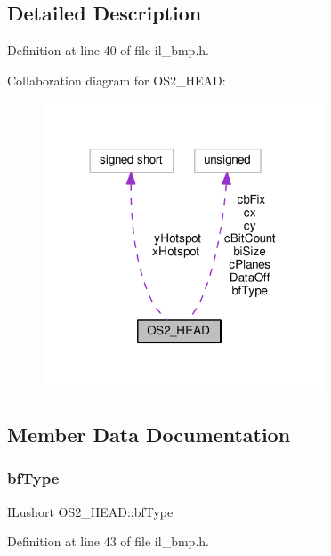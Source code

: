 \subsection{Detailed Description}


Definition at line 40 of file il\+\_\+bmp.\+h.



Collaboration diagram for O\+S2\+\_\+\+H\+E\+AD\+:
\nopagebreak
\begin{figure}[H]
\begin{center}
\leavevmode
\includegraphics[width=237pt]{dc/d07/structOS2__HEAD__coll__graph}
\end{center}
\end{figure}


\subsection{Member Data Documentation}
\mbox{\label{structOS2__HEAD_ae0b77ae9b8ebd0fab456e026ffed4baf}} 
\subsubsection{\texorpdfstring{bf\+Type}{bfType}}
{\footnotesize\ttfamily I\+Lushort O\+S2\+\_\+\+H\+E\+A\+D\+::bf\+Type}



Definition at line 43 of file il\+\_\+bmp.\+h.

\mbox{\label{structOS2__HEAD_a86fc8d64a103d5530402a5b980e58582}} 

